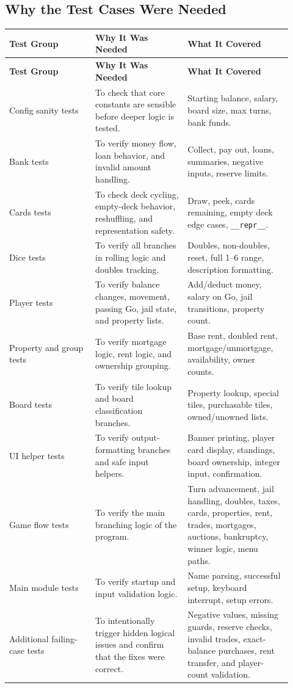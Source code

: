 \documentclass[12pt]{article}
\begin{document}
\subsection{Why the Test Cases Were Needed}
\small
\begin{longtable}{p{0.28\linewidth}p{0.30\linewidth}p{0.34\linewidth}}
\toprule
\textbf{Test Group} & \textbf{Why It Was Needed} & \textbf{What It Covered} \\
\midrule
\endfirsthead
\toprule
\textbf{Test Group} & \textbf{Why It Was Needed} & \textbf{What It Covered} \\
\midrule
\endhead
Config sanity tests & To check that core constants are sensible before deeper logic is tested. & Starting balance, salary, board size, max turns, bank funds. \\
Bank tests & To verify money flow, loan behavior, and invalid amount handling. & Collect, pay out, loans, summaries, negative inputs, reserve limits. \\
Cards tests & To check deck cycling, empty-deck behavior, reshuffling, and representation safety. & Draw, peek, cards remaining, empty deck edge cases, \texttt{\_\_repr\_\_}. \\
Dice tests & To verify all branches in rolling logic and doubles tracking. & Doubles, non-doubles, reset, full 1--6 range, description formatting. \\
Player tests & To verify balance changes, movement, passing Go, jail state, and property lists. & Add/deduct money, salary on Go, jail transitions, property count. \\
Property and group tests & To verify mortgage logic, rent logic, and ownership grouping. & Base rent, doubled rent, mortgage/unmortgage, availability, owner counts. \\
Board tests & To verify tile lookup and board classification branches. & Property lookup, special tiles, purchasable tiles, owned/unowned lists. \\
UI helper tests & To verify output-formatting branches and safe input helpers. & Banner printing, player card display, standings, board ownership, integer input, confirmation. \\
Game flow tests & To verify the main branching logic of the program. & Turn advancement, jail handling, doubles, taxes, cards, properties, rent, trades, mortgages, auctions, bankruptcy, winner logic, menu paths. \\
Main module tests & To verify startup and input validation logic. & Name parsing, successful setup, keyboard interrupt, setup errors. \\
Additional failing-case tests & To intentionally trigger hidden logical issues and confirm that the fixes were correct. & Negative values, missing guards, reserve checks, invalid trades, exact-balance purchases, rent transfer, and player-count validation. \\
\bottomrule
\end{longtable}
\normalsize
\end{document}

